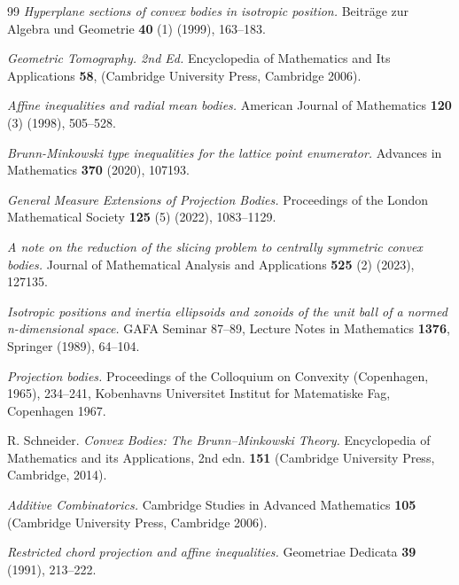 \documentclass[10pt]{amsart}
\numberwithin{equation}{section}
\begin{document}
\begin{thebibliography}{99}
\textit{Hyperplane sections of convex bodies in isotropic position.}
Beitr\"age zur Algebra und Geometrie {\bf 40} (1) (1999), 163--183.

\textit{Geometric Tomography. 2nd Ed.}
Encyclopedia of Mathematics and Its Applications {\bf 58}, (Cambridge University Press, Cambridge 2006).

\textit{Affine inequalities and radial mean bodies.}
American Journal of Mathematics {\bf 120} (3) (1998), 505--528.

\textit{Brunn-Minkowski type
inequalities for the lattice point enumerator.}
Advances in Mathematics {\bf 370} (2020), 107193.

\textit{General Measure Extensions of Projection Bodies.}
Proceedings of the London Mathematical Society {\bf 125} (5) (2022), 1083--1129. %

\textit{A note on the reduction of the slicing problem to centrally symmetric convex bodies.}
Journal of Mathematical Analysis and Applications {\bf 525} (2) (2023), 127135.

\textit{Isotropic positions and inertia ellipsoids and zonoids of the unit ball of a normed n-dimensional space.} GAFA Seminar 87--89,
Lecture Notes in Mathematics {\bf 1376}, Springer (1989), 64--104.

\textit{Projection bodies.}
Proceedings of the Colloquium on Convexity (Copenhagen, 1965), 234--241, Kobenhavns Universitet Institut for Matematiske Fag, Copenhagen 1967.

 {\sc R. Schneider.}
\textit{Convex Bodies: The Brunn--Minkowski Theory.} Encyclopedia of Mathematics and its Applications, 2nd edn.
{\bf 151} (Cambridge University Press, Cambridge, 2014).

\textit{Additive Combinatorics.}
Cambridge Studies in Advanced Mathematics {\bf 105} (Cambridge University Press, Cambridge 2006).

\textit{Restricted chord projection and affine inequalities.}
 Geometriae Dedicata {\bf 39} (1991), 213--222.


\end{thebibliography}
\end{document}

